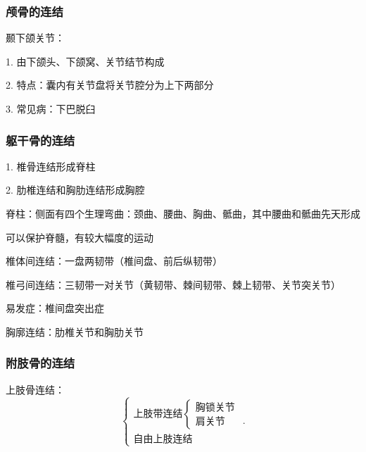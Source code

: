 \subsubsection{颅骨的连结}%
\label{subsub:颅骨的连结}
\begin{notation}
    颞下颌关节：

    1. 由下颌头、下颌窝、关节结节构成
    
    2. 特点：囊内有关节盘将关节腔分为上下两部分

    3. 常见病：下巴脱臼
\end{notation}
\subsubsection{躯干骨的连结}%
\label{subsub:躯干骨的连结}
1. 椎骨连结形成脊柱

2. 肋椎连结和胸肋连结形成胸腔
\begin{notation}
    脊柱：侧面有四个生理弯曲：颈曲、腰曲、胸曲、骶曲，其中腰曲和骶曲先天形成

    可以保护脊髓，有较大幅度的运动
\end{notation}
\begin{notation}
    椎体间连结：一盘两韧带（椎间盘、前后纵韧带）

    椎弓间连结：三韧带一对关节（黄韧带、棘间韧带、棘上韧带、关节突关节）

    易发症：椎间盘突出症
\end{notation}
\begin{notation}
    胸廓连结：肋椎关节和胸肋关节
\end{notation}
\subsubsection{附肢骨的连结}%
\label{subsub:附肢骨的连结}
\begin{notation}
    上肢骨连结：
    \[
        \begin{cases}
            \text{上肢带连结}\begin{cases}
                \text{胸锁关节}\\
                \text{肩关节} 
            \end{cases}\\ 
            \text{自由上肢连结}
        \end{cases}
    .\] 
\end{notation}






